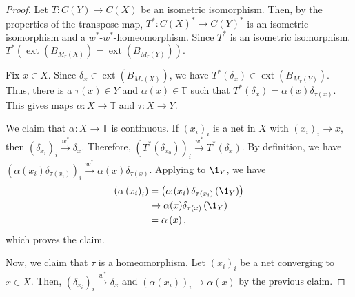 \documentclass[10pt]{mypackage}
\begin{document}
\begin{proof}
  Let $T\colon C\left( Y \right)\rightarrow C\left( X \right)$ be an isometric isomorphism. Then, by the properties of the transpose map, $T^{\ast}\colon C\left( X \right)^{\ast}\rightarrow C\left( Y \right)^{\ast}$ is an isometric isomorphism and a $w^{\ast}$-$w^{\ast}$-homeomorphism. Since $T^{\ast}$ is an isometric isomorphism. $T^{\ast}\left( \operatorname{ext}\left( B_{M_{r}\left( X \right)} \right) = \operatorname{ext}\left( B_{M_{r}\left( Y \right)} \right) \right)$.\newline

  Fix $x\in X$. Since $\delta_x\in \operatorname{ext}\left( B_{M_r\left( X \right)} \right)$, we have $T^{\ast}\left( \delta_x \right) \in \operatorname{ext}\left( B_{M_r\left( Y \right)} \right)$. Thus, there is a $\tau(x)\in Y$ and $\alpha(x)\in \mathbb{T}$ such that $T^{\ast}\left( \delta_x \right) = \alpha(x)\delta_{\tau(x)}$. This gives maps $\alpha\colon X\rightarrow \mathbb{T}$ and $\tau\colon X\rightarrow Y$.\newline

  We claim that $\alpha\colon X\rightarrow \mathbb{T}$ is continuous. If $\left( x_i \right)_{i}$ is a net in $X$ with $\left( x_i \right)_i\rightarrow x$, then $\left( \delta_{x_i} \right)_{i}\xrightarrow{w^{\ast}}\delta_{x}$. Therefore, $\left( T^{\ast}\left( \delta_{x_0} \right) \right)_{i}\xrightarrow{w^{\ast}}T^{\ast}\left( \delta_x \right)$. By definition, we have $\left( \alpha\left( x_i \right)\delta_{\tau\left( x_i \right)} \right)_{i}\xrightarrow{w^{\ast}}\alpha(x)\delta_{\tau(x)} $. Applying to $\1_{Y}$, we have
  \begin{align*}
    \left( \alpha\left( x_i \right)_{i} \right) &= \left( \alpha\left( x_i \right)\delta_{\tau\left( x_i \right)}\left( \1_{Y} \right) \right)\\
                                                &\rightarrow \alpha(x)\delta_{\tau(x)}\left( \1_{Y} \right)\\
                                                &= \alpha\left( x \right),
  \end{align*}
  which proves the claim.\newline

  Now, we claim that $\tau$ is a homeomorphism. Let $\left( x_i \right)_i$ be a net converging to $x\in  X$. Then, $\left( \delta_{x_i} \right)_{i}\xrightarrow{w^{\ast}}\delta_x$ and $\left( \alpha\left( x_i \right) \right)_i\rightarrow \alpha(x)$ by the previous claim.\newline


\end{proof}
\end{document}
